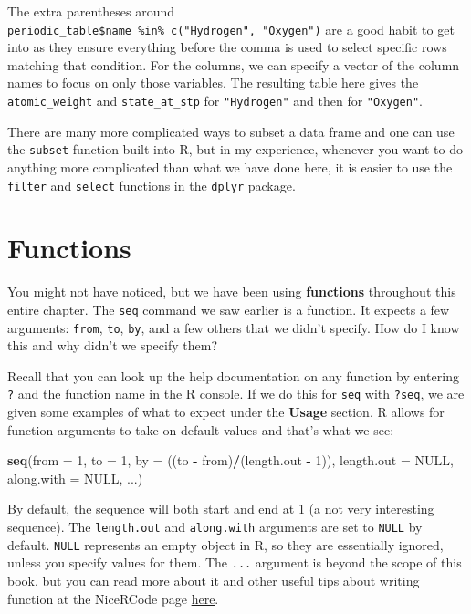 \documentclass[]{tufte-book}
\newenvironment{Shaded}{\begin{snugshade}}{\end{snugshade}}
\newcommand{\DataTypeTok}[1]{\textcolor[rgb]{0.13,0.29,0.53}{#1}}
\newcommand{\DecValTok}[1]{\textcolor[rgb]{0.00,0.00,0.81}{#1}}
\newcommand{\KeywordTok}[1]{\textcolor[rgb]{0.13,0.29,0.53}{\textbf{#1}}}
\newcommand{\NormalTok}[1]{#1}
\newcommand{\OperatorTok}[1]{\textcolor[rgb]{0.81,0.36,0.00}{\textbf{#1}}}
\newcommand{\OtherTok}[1]{\textcolor[rgb]{0.56,0.35,0.01}{#1}}
\newcommand{\StringTok}[1]{\textcolor[rgb]{0.31,0.60,0.02}{#1}}
\begin{document}
The extra parentheses around \texttt{periodic\_table\$name\ \%in\%\ c("Hydrogen",\ "Oxygen")} are a good habit to get into as they ensure everything before the comma is used to select specific rows matching that condition. For the columns, we can specify a vector of the column names to focus on only those variables. The resulting table here gives the \texttt{atomic\_weight} and \texttt{state\_at\_stp} for \texttt{"Hydrogen"} and then for \texttt{"Oxygen"}.

There are many more complicated ways to subset a data frame and one can use the \texttt{subset} function built into R, but in my experience, whenever you want to do anything more complicated than what we have done here, it is easier to use the \texttt{filter} and \texttt{select} functions in the \texttt{dplyr} package.

\hypertarget{functions}{%
\section{Functions}\label{functions}}

You might not have noticed, but we have been using \textbf{functions} throughout this entire chapter. The \texttt{seq} command we saw earlier is a function. It expects a few arguments: \texttt{from}, \texttt{to}, \texttt{by}, and a few others that we didn't specify. How do I know this and why didn't we specify them?

Recall that you can look up the help documentation on any function by entering \texttt{?} and the function name in the R console. If we do this for \texttt{seq} with \texttt{?seq}, we are given some examples of what to expect under the \textbf{Usage} section. R allows for function arguments to take on default values and that's what we see:

\begin{Shaded}
\begin{Highlighting}[]
\KeywordTok{seq}\NormalTok{(}\DataTypeTok{from =} \DecValTok{1}\NormalTok{, }\DataTypeTok{to =} \DecValTok{1}\NormalTok{, }\DataTypeTok{by =}\NormalTok{ ((to }\OperatorTok{-}\StringTok{ }\NormalTok{from)}\OperatorTok{/}\NormalTok{(length.out }\OperatorTok{-}\StringTok{ }\DecValTok{1}\NormalTok{)),}
  \DataTypeTok{length.out =} \OtherTok{NULL}\NormalTok{, }\DataTypeTok{along.with =} \OtherTok{NULL}\NormalTok{, ...)}
\end{Highlighting}
\end{Shaded}

By default, the sequence will both start and end at 1 (a not very interesting sequence). The \texttt{length.out} and \texttt{along.with} arguments are set to \texttt{NULL} by default. \texttt{NULL} represents an empty object in R, so they are essentially ignored, unless you specify values for them. The \texttt{...} argument is beyond the scope of this book, but you can read more about it and other useful tips about writing function at the NiceRCode page \href{http://nicercode.github.io/guides/functions/}{here}.
\end{document}
